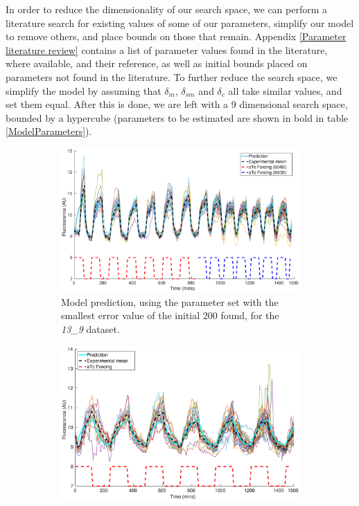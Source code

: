 \documentclass[10pt,journal]{./IEEE_latex_class/IEEEtran}
\begin{document}
In order to reduce the dimensionality of our search space, we can perform a literature search for existing values of some of our parameters, simplify our model to remove others, and place bounds on those that remain. Appendix \ref{Parameter literature review} contains a list of parameter values found in the literature, where available, and their reference, as well as initial bounds placed on parameters not found in the literature. To further reduce the search space, we simplify the model by assuming that $\delta_m$, $\delta_{sm}$ and $\delta_c$ all take similar values, and set them equal. After this is done, we are left with a 9 dimensional search space, bounded by a hypercube (parameters to be estimated are shown in bold in table \ref{ModelParameters}).

 
\begin{figure}
    \begin{subfigure}[c]{0.49\textwidth}
    \centering
    \includegraphics[scale = 0.24,clip = true, trim = 115 0 60 0]{13_9_bestPlot}
        \caption{Model prediction, using the parameter set with the smallest error value of the initial 200 found, for the \textit{13\_9} dataset.}
                \label{InitialResults_13_9_best}
    \end{subfigure}
    \begin{subfigure}[c]{0.49\textwidth}
    \centering
        \includegraphics[scale = 0.24,clip = true, trim = 100 0 70 0]{14_7_bestPlot}

\end{subfigure}
\end{figure}
\end{document}
